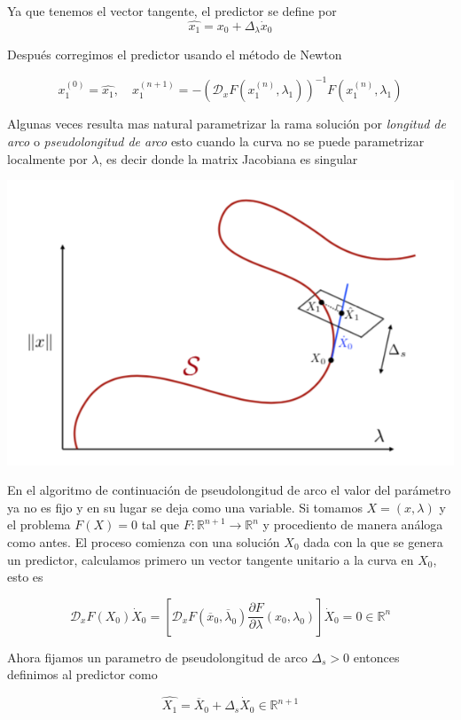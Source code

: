 \documentclass[11pt]{article}
\makeatletter
\def\maxwidth{\ifdim\Gin@nat@width>\linewidth\linewidth
    \else\Gin@nat@width\fi}
\let\Oldincludegraphics\includegraphics
\renewcommand{\includegraphics}[1]{\Oldincludegraphics[width=.8\maxwidth]{#1}}
\makeatother
\begin{document}
Ya que tenemos el vector tangente, el predictor se define por
\[\hat{x_1} = x_0 + \Delta_{\lambda}\dot{x}_0\]

Después corregimos el predictor usando el método de Newton

\[x_1^{(0)} = \hat{x_1}, \quad  x_1^{(n+1)} = -\left( \mathcal{D}_{x}F(x_1^{(n)}, \lambda_1) \right)^{-1} F \left(x_1^{(n)} , \lambda_{1} \right)\]

    Algunas veces resulta mas natural parametrizar la rama solución por
\emph{longitud de arco} o \emph{pseudolongitud de arco} esto cuando la
curva no se puede parametrizar localmente por \(\lambda\), es decir
donde la matrix Jacobiana es singular

    \includegraphics{image2.png}

    En el algoritmo de continuación de pseudolongitud de arco el valor del
parámetro ya no es fijo y en su lugar se deja como una variable. Si
tomamos \(X = (x, \lambda)\) y el problema \(F(X) = 0\) tal que
\(F:\mathbb{R}^{n+1} \longrightarrow \mathbb{R}^{n}\) y procediento de
manera análoga como antes. El proceso comienza con una solución \(X_0\)
dada con la que se genera un predictor, calculamos primero un vector
tangente unitario a la curva en \(X_0\), esto es

\[\mathcal{D}_{x}F(X_0)\dot{X}_0 = \left[ \mathcal{D}_{x}F(\overline{x}_0, \overline{\lambda}_0)  \dfrac{\partial F}{\partial  \lambda} (x_0 , \lambda_0) \right]\dot{X}_0 = 0 \in \mathbb{R}^n \]

Ahora fijamos un parametro de pseudolongitud de arco \(\Delta_{s} > 0\)
entonces definimos al predictor como

\[\hat{X_1} = \overline{X}_0 + \Delta_{s} \dot{X}_0 \in \mathbb{R}^{n+1}\]
\end{document}

